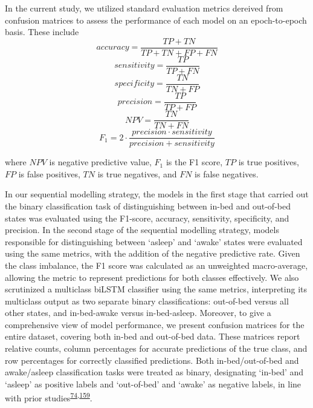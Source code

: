\documentclass[
  10pt,
]{scrbook}
\begin{document}
In the current study, we utilized standard evaluation metrics dereived
from confusion matrices to assess the performance of each model on an
epoch-to-epoch basis. These include
\[accuracy = \frac{TP+TN}{TP+TN+FP+FN}\]
\[sensitivity = \frac{TP}{TP+FN}\] \[specificity = \frac{TN}{TN+FP}\]
\[precision = \frac{TP}{TP+FP}\] \[NPV = \frac{TN}{TN + FN}\]
\[F_1 = 2 \cdot \frac{precision \cdot sensitivity}{precision + sensitivity}\]

where \(NPV\) is negative predictive value, \(F_1\) is the F1 score,
\(TP\) is true positives, \(FP\) is false positives, \(TN\) is true
negatives, and \(FN\) is false negatives.

In our sequential modelling strategy, the models in the first stage that
carried out the binary classification task of distinguishing between
in-bed and out-of-bed states was evaluated using the F1-score, accuracy,
sensitivity, specificity, and precision. In the second stage of the
sequential modelling strategy, models responsible for distinguishing
between `asleep' and `awake' states were evaluated using the same
metrics, with the addition of the negative predictive rate. Given the
class imbalance, the F1 score was calculated as an unweighted
macro-average, allowing the metric to represent predictions for both
classes effectively. We also scrutinized a multiclass biLSTM classifier
using the same metrics, interpreting its multiclass output as two
separate binary classifications: out-of-bed versus all other states, and
in-bed-awake versus in-bed-asleep. Moreover, to give a comprehensive
view of model performance, we present confusion matrices for the entire
dataset, covering both in-bed and out-of-bed data. These matrices report
relative counts, column percentages for accurate predictions of the true
class, and row percentages for correctly classified predictions. Both
in-bed/out-of-bed and awake/asleep classification tasks were treated as
binary, designating `in-bed' and `asleep' as positive labels and
`out-of-bed' and `awake' as negative labels, in line with prior
studies\textsuperscript{\protect\hyperlink{ref-hjorth_measure_2012}{74},\protect\hyperlink{ref-kushida_comparison_2001}{159}}.
\end{document}
